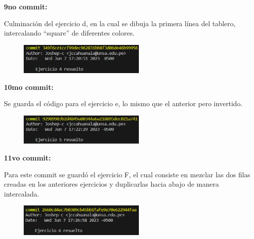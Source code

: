 \documentclass{article}
\begin{document}
	\textbf{9no commit:}
	
	\vspace{0.3cm}
	Culminación del ejercicio d, en la cual se dibuja la primera línea del tablero, intercalando “square” de diferentes colores.
	\vspace{0.3cm}
	
	\begin{figure}[H]
		\centering
		\includegraphics[width=0.55\textwidth,keepaspectratio]{img/commit9.png}
	\end{figure}
	
	\textbf{10mo commit:}
	
	\vspace{0.3cm}
	Se guarda el código para el ejercicio e, lo mismo que el anterior pero invertido.
	\vspace{0.3cm}
	
	\begin{figure}[H]
		\centering
		\includegraphics[width=0.55\textwidth,keepaspectratio]{img/commit10.png}
	\end{figure}
	
	\textbf{11vo commit:}
	
	\vspace{0.3cm}
	Para este commit se guardó el ejercicio F, el cual consiste en mezclar las dos filas creadas en los anteriores ejercicios y duplicarlas hacia abajo de manera intercalada.
	\vspace{0.3cm}
	
	\begin{figure}[H]
		\centering
		\includegraphics[width=0.55\textwidth,keepaspectratio]{img/commit11.png}
	\end{figure}
	
\end{document}
